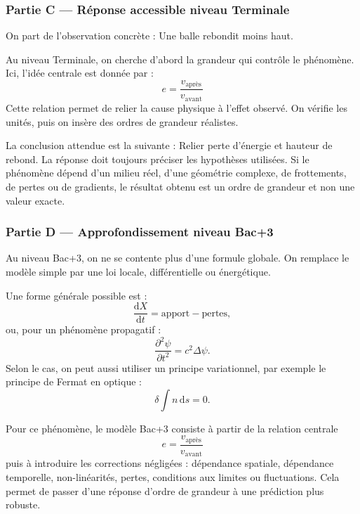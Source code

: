 \documentclass[11pt,a4paper]{article}
\begin{document}
\subsubsection*{Partie C — Réponse accessible niveau Terminale}

\begin{corrigebox}
On part de l'observation concrète : Une balle rebondit moins haut.

Au niveau Terminale, on cherche d'abord la grandeur qui contrôle le phénomène. Ici, l'idée centrale est donnée par :
\[
e=\frac{v_{\mathrm{après}}}{v_{\mathrm{avant}}}
\]
Cette relation permet de relier la cause physique à l'effet observé. On vérifie les unités, puis on insère des ordres de grandeur réalistes.

La conclusion attendue est la suivante : Relier perte d'énergie et hauteur de rebond. La réponse doit toujours préciser les hypothèses utilisées. Si le phénomène dépend d'un milieu réel, d'une géométrie complexe, de frottements, de pertes ou de gradients, le résultat obtenu est un ordre de grandeur et non une valeur exacte.
\end{corrigebox}

\subsubsection*{Partie D — Approfondissement niveau Bac+3}

\begin{approfondissementbox}
Au niveau Bac+3, on ne se contente plus d'une formule globale. On remplace le modèle simple par une loi locale, différentielle ou énergétique.

Une forme générale possible est :
\[
\frac{\mathrm d X}{\mathrm dt}=\text{apport}-\text{pertes},
\]
ou, pour un phénomène propagatif :
\[
\frac{\partial^2 \psi}{\partial t^2}=c^2\Delta\psi.
\]
Selon le cas, on peut aussi utiliser un principe variationnel, par exemple le principe de Fermat en optique :
\[
\delta \int n\,\mathrm ds=0.
\]

Pour ce phénomène, le modèle Bac+3 consiste à partir de la relation centrale
\[
e=\frac{v_{\mathrm{après}}}{v_{\mathrm{avant}}}
\]
puis à introduire les corrections négligées : dépendance spatiale, dépendance temporelle, non-linéarités, pertes, conditions aux limites ou fluctuations. Cela permet de passer d'une réponse d'ordre de grandeur à une prédiction plus robuste.
\end{approfondissementbox}
\end{document}
